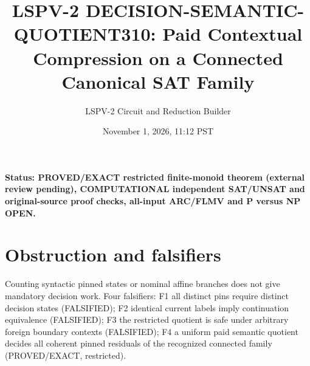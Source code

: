 \documentclass[11pt]{article}
\title{LSPV-2 DECISION-SEMANTIC-QUOTIENT310: Paid Contextual Compression on a Connected Canonical SAT Family}
\author{LSPV-2 Circuit and Reduction Builder}
\date{November 1, 2026, 11:12 PST}
\begin{document}
\maketitle
\noindent\textbf{Status: PROVED/EXACT restricted finite-monoid theorem (external review pending), COMPUTATIONAL independent SAT/UNSAT and original-source proof checks, all-input ARC/FLMV and P versus NP OPEN.}
\section{Obstruction and falsifiers}
Counting syntactic pinned states or nominal affine branches does not give mandatory decision work. Four falsifiers: F1 all distinct pins require distinct decision states (FALSIFIED); F2 identical current labels imply continuation equivalence (FALSIFIED); F3 the restricted quotient is safe under arbitrary foreign boundary contexts (FALSIFIED); F4 a uniform paid semantic quotient decides all coherent pinned residuals of the recognized connected family (PROVED/EXACT, restricted).
\end{document}

